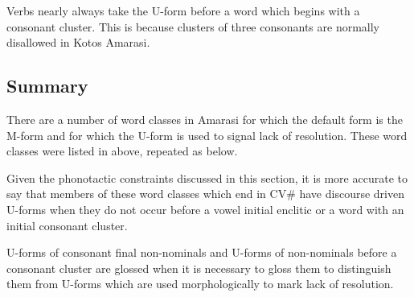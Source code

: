 Verbs nearly always take the U-form
before a word which begins with a consonant cluster.
This is because clusters of three consonants are
normally disallowed in Kotos Amarasi.

\subsection{Summary}
There are a number of word classes in Amarasi for which the default form is the M-form
and for which the U-form is used to signal lack of resolution.
These word classes were listed in  above,
repeated as  below.

\begin{exe}
	\label{ex:WorClaDisMet2}
		\begin{xlist}
		\end{xlist}
\end{exe}

Given the phonotactic constraints discussed in this section,
it is more accurate to say
that members of these word classes which end in CV{\#}
have discourse driven U-forms when they do not occur
before a vowel initial enclitic or a word with an initial consonant cluster.

U-forms of consonant final non-nominals and U-forms of non-nominals
before a consonant cluster are glossed {\Uc} when it is necessary
to gloss them to distinguish them from U-forms which
are used morphologically to mark lack of resolution.
